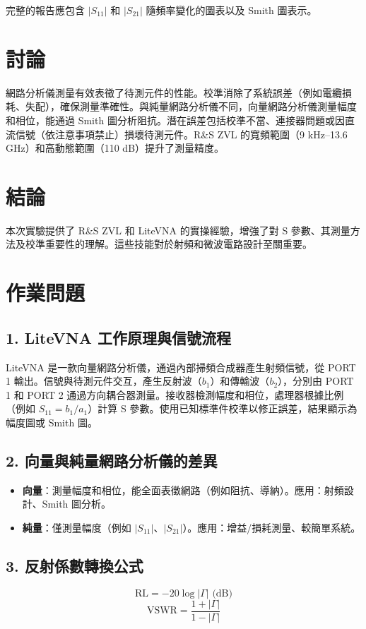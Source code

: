 \documentclass[ paper=a4paper, 12pt]{article}
\begin{document}
完整的報告應包含 \(|S_{11}|\) 和 \(|S_{21}|\) 隨頻率變化的圖表以及 Smith 圖表示。

\section{討論}
網路分析儀測量有效表徵了待測元件的性能。校準消除了系統誤差（例如電纜損耗、失配），確保測量準確性。與純量網路分析儀不同，向量網路分析儀測量幅度和相位，能通過 Smith 圖分析阻抗。潛在誤差包括校準不當、連接器問題或因直流信號（依注意事項禁止）損壞待測元件。R\&S ZVL 的寬頻範圍（9 kHz–13.6 GHz）和高動態範圍（110 dB）提升了測量精度。

\section{結論}
本次實驗提供了 R\&S ZVL 和 LiteVNA 的實操經驗，增強了對 S 參數、其測量方法及校準重要性的理解。這些技能對於射頻和微波電路設計至關重要。

\section{作業問題}
\subsection{1. LiteVNA 工作原理與信號流程}
LiteVNA 是一款向量網路分析儀，通過內部掃頻合成器產生射頻信號，從 PORT 1 輸出。信號與待測元件交互，產生反射波（\(b_1\)）和傳輸波（\(b_2\)），分別由 PORT 1 和 PORT 2 通過方向耦合器測量。接收器檢測幅度和相位，處理器根據比例（例如 \(S_{11} = b_1/a_1\)）計算 S 參數。使用已知標準件校準以修正誤差，結果顯示為幅度圖或 Smith 圖。

\subsection{2. 向量與純量網路分析儀的差異}
\begin{itemize}
\item \textbf{向量}：測量幅度和相位，能全面表徵網路（例如阻抗、導納）。應用：射頻設計、Smith 圖分析。
\item \textbf{純量}：僅測量幅度（例如 \(|S_{11}|\)、\(|S_{21}|\)）。應用：增益/損耗測量、較簡單系統。

\end{itemize}

\subsection{3. 反射係數轉換公式}
\[
\text{RL} = -20 \log |\Gamma| \text{ (dB)}
\]
\[
\text{VSWR} = \frac{1 + |\Gamma|}{1 - |\Gamma|}
\]
\end{document}
